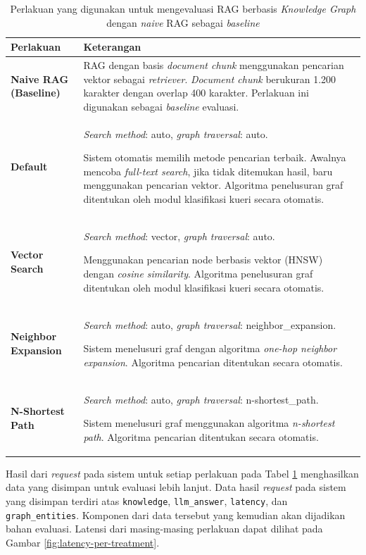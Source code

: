 \begin{table}[H]
	\centering
	\caption{Perlakuan yang digunakan untuk mengevaluasi RAG berbasis \textit{Knowledge Graph} dengan \textit{naive} RAG sebagai \textit{baseline}}
	\label{tab:evaluation-treatment}
	\begin{tabular}{|l|p{9cm}|}
		\hline
		\textbf{Perlakuan}            & \textbf{Keterangan}                                 \\
		\hline \hline
		\textbf{Naive RAG (Baseline)} &
		RAG dengan basis \textit{document chunk} menggunakan pencarian vektor sebagai \textit{retriever}.
		\textit{Document chunk} berukuran 1.200 karakter dengan overlap 400 karakter.
		Perlakuan ini digunakan sebagai \textit{baseline} evaluasi.                         \\
		\hline
		\textbf{Default}              &
		\textit{Search method}: auto, \textit{graph traversal}: auto.

		Sistem otomatis memilih metode pencarian terbaik.
		Awalnya mencoba \textit{full-text search}, jika tidak ditemukan hasil, baru menggunakan pencarian vektor.
		Algoritma penelusuran graf ditentukan oleh modul klasifikasi kueri secara otomatis. \\
		\hline
		\textbf{Vector Search}        &
		\textit{Search method}: vector, \textit{graph traversal}: auto.

		Menggunakan pencarian node berbasis vektor (HNSW) dengan \textit{cosine similarity}.
		Algoritma penelusuran graf ditentukan oleh modul klasifikasi kueri secara otomatis. \\
		\hline
		\textbf{Neighbor Expansion}   &
		\textit{Search method}: auto, \textit{graph traversal}: neighbor\_expansion.

		Sistem menelusuri graf dengan algoritma \textit{one-hop neighbor expansion}.
		Algoritma pencarian ditentukan secara otomatis.                                     \\
		\hline
		\textbf{N-Shortest Path}      &
		\textit{Search method}: auto, \textit{graph traversal}: n-shortest\_path.

		Sistem menelusuri graf menggunakan algoritma \textit{n-shortest path}.
		Algoritma pencarian ditentukan secara otomatis.                                     \\
		\hline
	\end{tabular}
\end{table}

Hasil dari \textit{request} pada sistem untuk setiap perlakuan pada Tabel \ref{tab:evaluation-treatment} menghasilkan data yang disimpan untuk evaluasi lebih lanjut.
Data hasil \textit{request} pada sistem yang disimpan terdiri atas \texttt{knowledge}, \texttt{llm\_answer}, \texttt{latency}, dan \texttt{graph\_entities}.
Komponen dari data tersebut yang kemudian akan dijadikan bahan evaluasi.
Latensi dari masing-masing perlakuan dapat dilihat pada Gambar \ref{fig:latency-per-treatment}.

